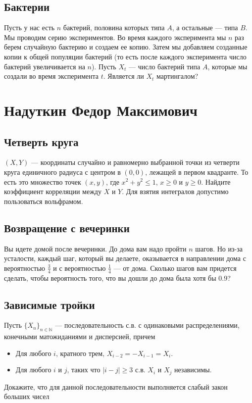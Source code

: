 \documentclass[12pt]{article}
\newcommand\N{\mathbb{N}}
\begin{document}
\subsection{Бактерии}

Пусть у нас есть $n$ бактерий, половина которых типа $A$, а остальные --- типа $B$. Мы проводим серию экспериментов. Во время каждого эксперимента мы $n$ раз берем случайную бактерию и создаем ее копию. Затем мы добавляем созданные копии к общей популяции бактерий (то есть после каждого эксперимента число бактерий увеличивается на $n$). Пусть $X_t$ --- число бактерий типа $A$, которые мы создали во время эксперимента $t$. Является ли $X_t$ мартингалом?


\newpage
\section{Надуткин Федор Максимович}

\subsection{Четверть круга}

$(X, Y)$ --- координаты случайно и равномерно выбранной точки из четверти круга единичного радиуса с центром в $(0, 0)$, лежащей в первом квадранте. То есть это множество точек $(x, y)$, где $x^2 + y^2 \le 1$, $x \ge 0$ и $y \ge 0$. Найдите коэффициент корреляции между $X$ и $Y$. Для взятия интегралов  допустимо пользоваться вольфрамом.


\subsection{Возвращение с вечеринки}

Вы идете домой после вечеринки. До дома вам надо пройти $n$ шагов. Но из-за усталости, каждый шаг, который вы делаете, оказывается в направлении дома с вероятностью $\frac{3}{4}$ и с вероятностью $\frac{1}{4}$ --- от дома. Сколько шагов вам придется сделать, чтобы вероятность того, что вы дошли до дома была хотя бы $0.9$?

\subsection{Зависимые тройки}
Пусть $\{X_n\}_{n \in \N}$ --- последовательность с.в. с одинаковыми распределениями, конечными матожиданиями и дисперсией, причем
\begin{itemize}
    \item Для любого $i$, кратного трем, $X_{i - 2} = - X_{i - 1} = X_{i}$. 
    \item Для любого $i$ и $j$, таких что $|i - j| \ge 3$ с.в. $X_i$ и $X_j$ независимы.
\end{itemize}
Докажите, что для данной последовательности выполняется слабый закон больших чисел
\end{document}
